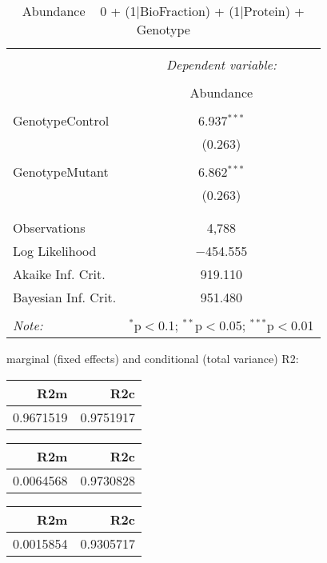 \documentclass[11pt]{report}
\begin{document}
\begin{table}[!htbp] \centering 
  \caption{Abundance ~ 0 + (1|BioFraction) + (1|Protein) + Genotype} 
  \label{} 
\begin{tabular}{@{\extracolsep{5pt}}lc} 
\\[-1.8ex]\hline 
\hline \\[-1.8ex] 
 & \multicolumn{1}{c}{\textit{Dependent variable:}} \\ 
\cline{2-2} 
\\[-1.8ex] & Abundance \\ 
\hline \\[-1.8ex] 
 GenotypeControl & 6.937$^{***}$ \\ 
  & (0.263) \\ 
  & \\ 
 GenotypeMutant & 6.862$^{***}$ \\ 
  & (0.263) \\ 
  & \\ 
\hline \\[-1.8ex] 
Observations & 4,788 \\ 
Log Likelihood & $-$454.555 \\ 
Akaike Inf. Crit. & 919.110 \\ 
Bayesian Inf. Crit. & 951.480 \\ 
\hline 
\hline \\[-1.8ex] 
\textit{Note:}  & \multicolumn{1}{r}{$^{*}$p$<$0.1; $^{**}$p$<$0.05; $^{***}$p$<$0.01} \\ 
\end{tabular} 
\end{table} 
marginal (fixed effects) and conditional (total variance) R2:

\begin{tabular}{r|r}
\hline
R2m & R2c\\
\hline
0.9671519 & 0.9751917\\
\hline
\end{tabular}

\begin{tabular}{r|r}
\hline
R2m & R2c\\
\hline
0.0064568 & 0.9730828\\
\hline
\end{tabular}

\begin{tabular}{r|r}
\hline
R2m & R2c\\
\hline
0.0015854 & 0.9305717\\
\hline
\end{tabular}
\end{document}
